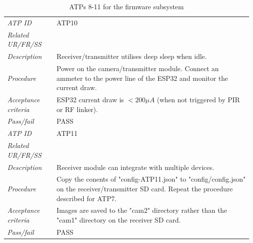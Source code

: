 \begin{table}[!ht]
\begin{scriptsize}
\begin{tabularx}{\textwidth}{|p{} X|}
        \textit{ATP ID} & ATP10\\
        \textit{Related UR/FR/SS} & \\
        \textit{Description} & Receiver/transmitter utilises deep sleep when idle.\\
        \textit{Procedure} & Power on the camera/transmitter module. Connect an ammeter to the power line of the ESP32 and monitor the current draw. \\
        \textit{Acceptance criteria} & ESP32 current draw is $ < 200 \mu A $ (when not triggered by PIR or RF linker).\\ 
        \textit{Pass/fail} & PASS\\ \hline

        \textit{ATP ID} & ATP11\\
        \textit{Related UR/FR/SS} & \\
        \textit{Description} & Receiver module can integrate with multiple devices.\\
        \textit{Procedure} & Copy the conents of "config-ATP11.json" to "config/config.json" on the receiver/transmitter SD card. Repeat the procedure described for ATP7. \\
        \textit{Acceptance criteria} & Images are saved to the "cam2" directory rather than the "cam1" directory on the receiver SD card.\\ 
        \textit{Pass/fail} & PASS\\ \hline
        

    \end{tabularx}
    \end{scriptsize}
    \caption{ATPs 8-11 for the firmware subsystem}
    \label{tab:firmware-atps2}
\end{table}